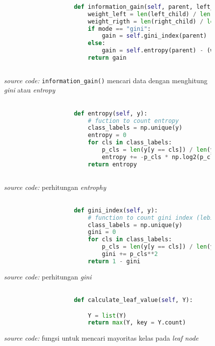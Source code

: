 		\begin{figure}[H]
			\begin{lstlisting}[language=Python, basicstyle=\tiny]
					
					def information_gain(self, parent, left_child, right_child, mode="entropy"):
						weight_left = len(left_child) / len(parent)
						weight_rigth = len(right_child) / len(parent)
						if mode == "gini":
							gain = self.gini_index(parent) - (weight_left * self.gini_index(left_child) + weight_rigth * self.gini_index(right_child))
						else:
							gain = self.entropy(parent) - (weight_left * self.entropy(left_child) + weight_rigth * self.entropy(right_child))
						return gain
					
			\end{lstlisting}
			\caption{\emph{source code:} \texttt{information\_gain()} mencari data dengan menghitung \emph{gini} 
			atau \textit{entropy}}
			\label{code: split function}
		\end{figure}
		
		\begin{figure}[H]
			\begin{lstlisting}[language=Python, basicstyle=\tiny]

					def entropy(self, y):
						# fuction to count entropy
						class_labels = np.unique(y)
						entropy = 0
						for cls in class_labels:
							p_cls = len(y[y == cls]) / len(y)
							entropy += -p_cls * np.log2(p_cls)
						return entropy
					
			\end{lstlisting}
			\caption{\emph{source code:} perhitungan \emph{entrophy}}
			\label{code: entrophy calculation function}
		\end{figure}

		\begin{figure}[H]
			\begin{lstlisting}[language=Python, basicstyle=\tiny]

					def gini_index(self, y):
						# function to count gini index (lebih cepet aja karna gak pake log)
						class_labels = np.unique(y)
						gini = 0
						for cls in class_labels:
							p_cls = len(y[y == cls]) / len(y)
							gini += p_cls**2
						return 1 - gini

			\end{lstlisting}
			\caption{\emph{source code:} perhitungan \emph{gini}}
			\label{code: gini calculation function}
		\end{figure}

		\begin{figure}[H]
			\begin{lstlisting}[language=Python, basicstyle=\tiny]

					def calculate_leaf_value(self, Y):

						Y = list(Y)
						return max(Y, key = Y.count)

			\end{lstlisting}
			\caption{\emph{source code:} fungsi untuk mencari mayoritas 
			kelas pada \textit{leaf node}}
			\label{code: find majority class in node function}
		\end{figure} 

